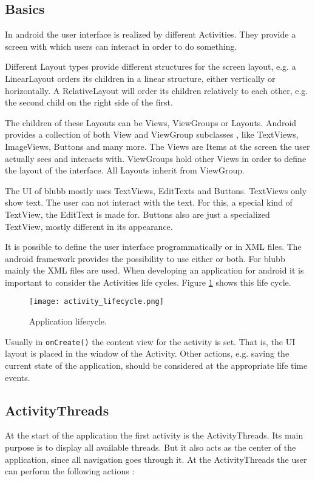 \documentclass[12pt,a4paper,oneside]{report}
\newcommand{\appname}{blubb}
\newcommand{\code}[1]{\lstinline{#1}}
\begin{document}
\subsection{Basics}
In android the user interface is realized by different Activities. They provide a screen with which users can interact in order to do something\citep{aDefActivities}.


 Different Layout types provide different structures for the screen layout, e.g. a LinearLayout orders its  children in a linear structure, either vertically or horizontally. A RelativeLayout will order its children relatively to each other, e.g. the second child on the right side of the first.
 
 The children of these Layouts can be Views, ViewGroups or Layouts. Android provides a collection of both View and ViewGroup subclasses \citep{aDefUIOV}, like TextViews, ImageViews, Buttons and many more. The Views are Items at the screen the user actually sees and interacts with. ViewGroups hold other Views in order to define the layout of the interface. All Layouts inherit from ViewGroup.
 
The UI of \appname{} mostly uses TextViews, EditTexts and Buttons. TextViews only show text. The user can not interact with the text. For this, a special kind of TextView, the EditText is made for. Buttons also are just a specialized TextView, mostly different in its appearance. 


It is possible to define the user interface programmatically or in XML files. The android framework provides the possibility to use either or both. For \appname{} mainly the XML files are used. 
When developing an application for android it is important to consider the Activities life cycles. Figure \ref{fig:activitylivecycle} shows this life cycle.
 
\begin{figure}[!ht]
    \texttt{[image: activity\_lifecycle.png]}
	\caption{Application lifecycle.} 
	\label{fig:activitylivecycle}
\end{figure}

Usually in \code{onCreate()} the content view for the activity is set. That is, the UI layout is placed in the window of the Activity. Other actions, e.g. saving the current state of the application, should be considered at the appropriate life time events.

\subsection{ActivityThreads}
At the start of the application the first activity is the ActivityThreads.
Its main purpose is to display all available threads. 
But it also acts as the center of the application, since all navigation goes through it.
At the ActivityThreads the user can perform the following actions :
\end{document}
